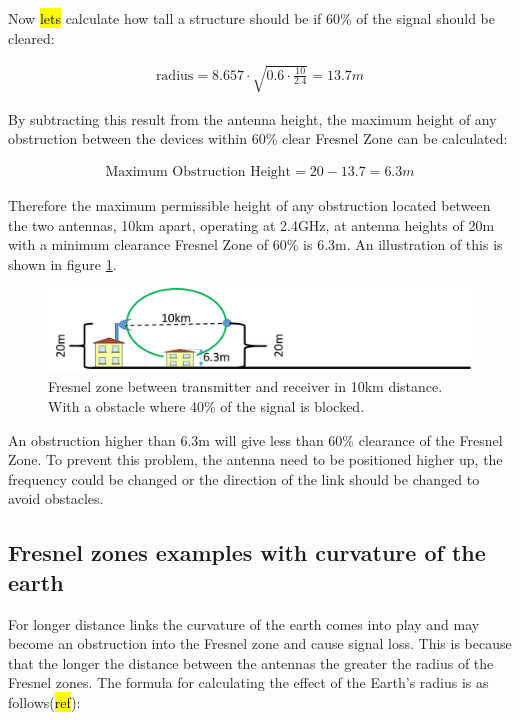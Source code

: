 \noindent Now \hl{lets} calculate how tall a structure should be if 60\% of the signal should be cleared:

\begin{align*}
\text{radius} = 8.657\cdot \sqrt{0.6\cdot \frac{10}{2.4}} = 13.7m
\end{align*}
  
\noindent By subtracting this result from the antenna height, the maximum height of any obstruction between the devices within 60\% clear Fresnel Zone can be calculated:

\begin{align*}
\text{Maximum Obstruction Height} = 20 - 13.7 = 6.3m
\end{align*}

Therefore the maximum permissible height of any obstruction located between the two antennas, 10km apart, operating at 2.4GHz, at antenna heights of 20m with a minimum clearance Fresnel Zone of 60\% is 6.3m. An illustration of this is shown in figure \ref{fig:fresnel_zones_10km_60procent}.

\begin{figure}[H]
	\centering
	\includegraphics[scale=0.50]{figures/fresnel_10km_60procent.png}
	\caption{Fresnel zone between transmitter and receiver in 10km distance. With a obstacle where 40\% of the signal is blocked.}
	\label{fig:fresnel_zones_10km_60procent}
\end{figure}  

\noindent An obstruction higher than 6.3m will give less than 60\% clearance of the Fresnel Zone. To prevent this problem, the antenna need to be positioned higher up, the frequency could be changed or the direction of the link should be changed to avoid obstacles.

\subsection{Fresnel zones examples with curvature of the earth}
For longer distance links the curvature of the earth comes into play and may become an obstruction into the Fresnel zone and cause signal loss. This is because that the longer the distance between the antennas the greater the radius of the Fresnel zones. The formula for calculating the effect of the Earth's radius is as follows(\hl{ref}):

